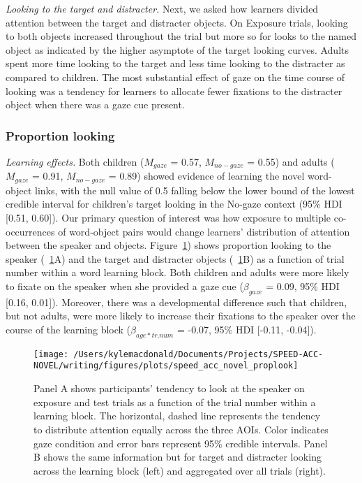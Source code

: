 \documentclass[man,floatsintext]{apa6}
\begin{document}
\emph{Looking to the target and distracter.} Next, we asked how learners
divided attention between the target and distracter objects. On Exposure
trials, looking to both objects increased throughout the trial but more
so for looks to the named object as indicated by the higher asymptote of
the target looking curves. Adults spent more time looking to the target
and less time looking to the distracter as compared to children. The
most substantial effect of gaze on the time course of looking was a
tendency for learners to allocate fewer fixations to the distracter
object when there was a gaze cue present.

\subsubsection{Proportion looking}\label{proportion-looking}

\emph{Learning effects.} Both children (\(M_{gaze}\) = 0.57,
\(M_{no-gaze}\) = 0.55) and adults (\(M_{gaze}\) = 0.91, \(M_{no-gaze}\)
= 0.89) showed evidence of learning the novel word-object links, with
the null value of 0.5 falling below the lower bound of the lowest
credible interval for children's target looking in the No-gaze context
(95\% HDI {[}0.51, 0.60{]}). Our primary question of interest was how
exposure to multiple co-occurrences of word-object pairs would change
learners' distribution of attention between the speaker and objects.
Figure~\ref{fig:san-prop-looking-plot}) shows proportion looking to the
speaker (~\ref{fig:san-prop-looking-plot}A) and the target and
distracter objects (~\ref{fig:san-prop-looking-plot}B) as a function of
trial number within a word learning block. Both children and adults were
more likely to fixate on the speaker when she provided a gaze cue
(\(\beta_{gaze}\) = 0.09, 95\% HDI {[}0.16, 0.01{]}). Moreover, there
was a developmental difference such that children, but not adults, were
more likely to increase their fixations to the speaker over the course
of the learning block (\(\beta_{age*tr.num}\) = -0.07, 95\% HDI
{[}-0.11, -0.04{]}).

\begin{figure}[!t]

{\centering \texttt{[image: /Users/kylemacdonald/Documents/Projects/SPEED-ACC-NOVEL/writing/figures/plots/speed\_acc\_novel\_proplook]} 

}

\caption{Panel A shows participants’ tendency to look at the speaker on exposure and test trials as a function of the trial number within a learning block. The horizontal, dashed line represents the tendency to distribute attention equally across the three AOIs. Color indicates gaze condition and error bars represent 95\% credible intervals. Panel B shows the same information but for target and distracter looking across the learning block (left) and aggregated over all trials (right).}\label{fig:san-prop-looking-plot}
\end{figure}
\end{document}
